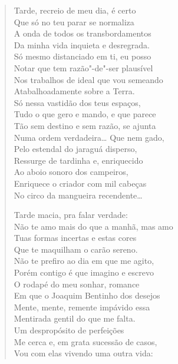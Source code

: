 {\begin{verse}
Tarde, recreio de meu dia, é certo\\
Que só no teu parar se normaliza\\
A onda de todos os transbordamentos\\
Da minha vida inquieta e desregrada.\\
Só mesmo distanciado em ti, eu posso\\
Notar que tem razão"-de"-ser plausível\\
Nos trabalhos de ideal que vou semeando\\
Atabalhoadamente sobre a Terra.\\
Só nessa vastidão dos teus espaços,\\
Tudo o que gero e mando, e que parece\\
Tão sem destino e sem razão, se ajunta\\
Numa ordem verdadeira\ldots{} Que nem gado,\\
Pelo estendal do jaraguá disperso,\\
Ressurge de tardinha e, enriquecido\\
Ao aboio sonoro dos campeiros,\\
Enriquece o criador com mil cabeças\\
No circo da mangueira recendente\ldots{}

Tarde macia, pra falar verdade:\\
Não te amo mais do que a manhã, mas amo\\
Tuas formas incertas e estas cores\\
Que te maquilham o carão sereno.\\
Não te prefiro ao dia em que me agito,\\
Porém contigo é que imagino e escrevo\\
O rodapé do meu sonhar, romance\\
Em que o Joaquim Bentinho dos desejos\\
Mente, mente, remente impávido essa\\
Mentirada gentil do que me falta.\\
Um despropósito de perfeições\\
Me cerca e, em grata sucessão de casos,\\
Vou com elas vivendo uma outra vida:


\end{verse}}
